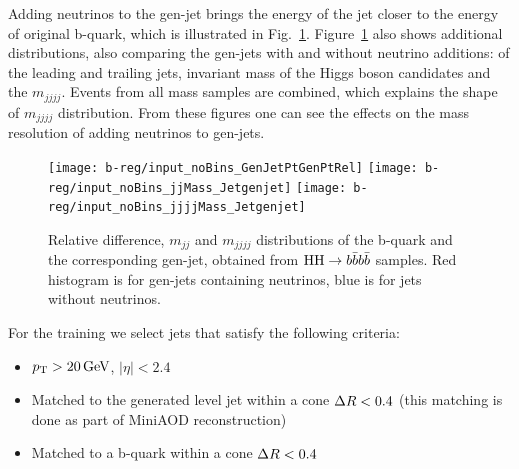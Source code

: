 Adding neutrinos to the gen-jet brings the energy of the jet closer to the energy of original b-quark, which is illustrated in Fig.~\ref{fig:b-reg-quark}.  
Figure~\ref{fig:b-reg-quark} also shows additional distributions, also comparing the gen-jets with and without
neutrino additions: \PT of the leading and trailing jets, invariant mass of the Higgs boson candidates and the $m_{jjjj}$. 
Events from all mass samples are combined, which explains the shape of $m_{jjjj}$ distribution. 
From these figures one can see the effects on the mass resolution of adding neutrinos to gen-jets.

\begin{figure}[h]
  \centering
  \texttt{[image: b-reg/input\_noBins\_GenJetPtGenPtRel]}\hfil
  \texttt{[image: b-reg/input\_noBins\_jjMass\_Jetgenjet]}\hfil
  \texttt{[image: b-reg/input\_noBins\_jjjjMass\_Jetgenjet]}\hfil

  \caption{Relative \PT difference, $m_{jj}$ and $m_{jjjj}$ distributions of the b-quark and the
    corresponding gen-jet, obtained from $\mathrm{H}\mathrm{H}\to b\bar{b}b\bar{b}$ samples. Red
    histogram is for gen-jets containing neutrinos, blue is for jets
    without neutrinos.}
  \label{fig:b-reg-quark}
\end{figure}

For the training we select jets that satisfy the following criteria:
\begin{itemize}
\item $p_{\mathrm{T}} > 20\,\text{Ge\hspace{-.08em}V}$, $|\eta| < 2.4$
\item Matched to the generated level jet within a cone $\Delta R<0.4$ (this matching is done as part of MiniAOD reconstruction)
\item Matched to a b-quark within a cone $\Delta R<0.4$
\end{itemize}


